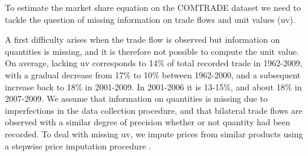 \documentclass[12pt,twoside,a4paper,notitlepage]{article}
\begin{document}
To estimate the market share equation on the COMTRADE dataset we need to tackle the question of missing information on trade flows and unit values (uv).

A first difficulty arises when the trade flow is observed but information on quantities is missing, and it is therefore not possible to compute the unit value. On average, lacking uv corresponds to 14\% of total recorded trade in 1962-2009, with a gradual decrease from 17\% to 10\% between 1962-2000, and a subsequent increase back to 18\% in 2001-2009. In%
 2001-2006 it is 13-15\%, and about 18\% in 2007-2009. We assume that information on quantities is missing due to imperfections in the data collection procedure, and that bilateral trade flows are observed with a similar degree of precision whether or not quantity had been recorded. To deal with missing uv, we impute prices from similar products using a stepwise price imputation procedure%
.
\end{document}
